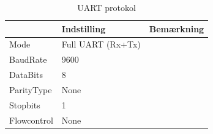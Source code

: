 \begin{table}[h]
	\centering
	\caption{UART protokol}
	\label{tab:UARTprotokol}
	\begin{tabular}{@{}lll@{}}
		\toprule
							& Indstilling       		& Bemærkning \\ \midrule
		Mode       		& Full UART (Rx+Tx) &            \\
		BaudRate 	  & 9600             		 &            \\
		DataBits    	& 8             			    &            \\
		ParityType 	  	& None     			         &            \\
		Stopbits    	& 1               				  &            \\
		Flowcontrol 	& None         		     &           \\ \hline
	\end{tabular}
\end{table}

